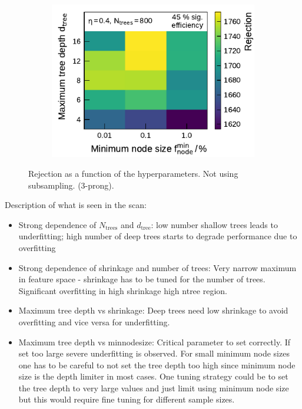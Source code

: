 \begin{figure}[ht]
\begin{subfigure}[t]{0.48\textwidth}
  \end{subfigure}\hfill
  \begin{subfigure}[t]{0.48\textwidth}
    \centering
    \includegraphics{./figures/bdt_perf/gridsearch_3p/scan_MinNodeSize_MaxDepth.pdf}
  \end{subfigure}
  \caption{Rejection as a function of the hyperparameters. Not using
    subsampling. (3-prong).  }
  \label{fig:hyperparameter_scan_3p}
\end{figure}

Description of what is seen in the scan:
\begin{itemize}
\item Strong dependence of $N_\text{trees}$ and $d_\text{tree}$: low number
  shallow trees leads to underfitting; high number of deep trees starts to
  degrade performance due to overfitting
\item Strong dependence of shrinkage and number of trees: Very narrow maximum in
  feature space - shrinkage has to be tuned for the number of trees. Significant
  overfitting in high shrinkage high ntree region.
\item Maximum tree depth vs shrinkage: Deep trees need low shrinkage to avoid
  overfitting and vice versa for underfitting.
\item Maximum tree depth vs minnodesize: Critical parameter to set correctly. If
  set too large severe underfitting is observed. For small minimum node sizes
  one has to be careful to not set the tree depth too high since minimum node
  size is the depth limiter in most cases. One tuning strategy could be to set
  the tree depth to very large values and just limit using minimum node size but
  this would require fine tuning for different sample sizes.
\end{itemize}


